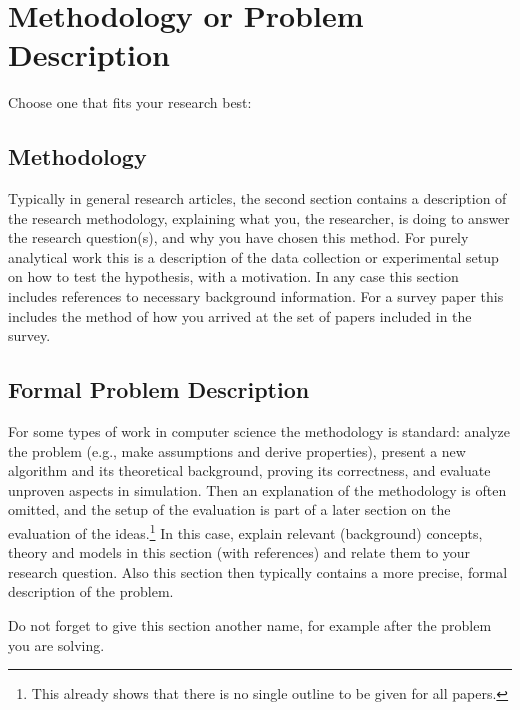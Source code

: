 \section{Methodology or Problem Description}
Choose one that fits your research best:
\subsection{Methodology}
Typically in general research articles, the second section contains a description of the research methodology, explaining what you, the researcher, is doing to answer the research question(s), and why you have chosen this method.
For purely analytical work this is a description of the data collection or experimental setup on how to test the hypothesis, with a motivation.
In any case this section includes references to necessary background information.
For a survey paper this includes the method of how you arrived at the set of papers included in the survey.

\subsection{Formal Problem Description}
For some types of work in computer science the methodology is standard: analyze the problem (e.g., make assumptions and derive properties), present a new algorithm and its theoretical background, proving its correctness, and evaluate unproven aspects in simulation.
Then an explanation of the methodology is often omitted, and the setup of the evaluation is part of a later section on the evaluation of the ideas.\footnote{This already shows that there is no single outline to be given for all papers.}
In this case, explain relevant (background) concepts, theory and models in this section (with references) and relate them to your research question.
Also this section then typically contains a more precise, formal description of the problem.

Do not forget to give this section another name, for example after the problem you are solving.
